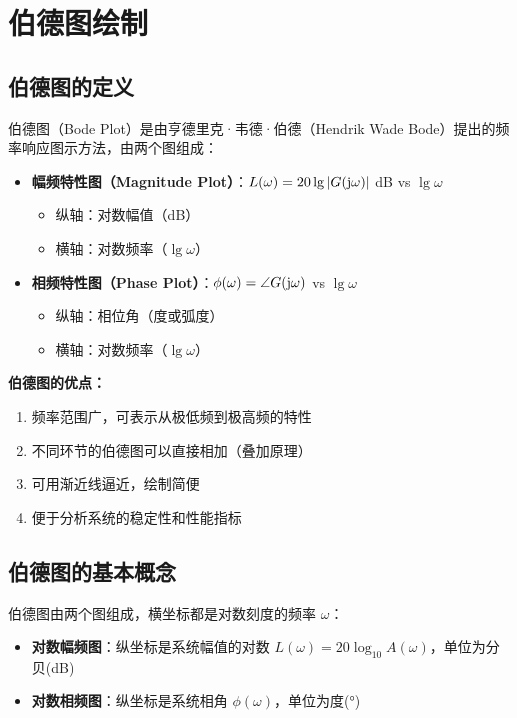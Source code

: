 \section{伯德图绘制}

\subsection{伯德图的定义}
伯德图（Bode Plot）是由亨德里克·韦德·伯德（Hendrik Wade Bode）提出的频率响应图示方法，由两个图组成：

\begin{itemize}
    \item \textbf{幅频特性图（Magnitude Plot）}：$L(\omega) = 20\lg|G(\mathrm{j}\omega)|$ dB vs $\lg\omega$
    \begin{itemize}
        \item 纵轴：对数幅值（dB）
        \item 横轴：对数频率（$\lg\omega$）
    \end{itemize}
    \item \textbf{相频特性图（Phase Plot）}：$\phi(\omega) = \angle G(\mathrm{j}\omega)$ vs $\lg\omega$
    \begin{itemize}
        \item 纵轴：相位角（度或弧度）
        \item 横轴：对数频率（$\lg\omega$）
    \end{itemize}
\end{itemize}

\textbf{伯德图的优点：}
\begin{enumerate}
    \item 频率范围广，可表示从极低频到极高频的特性
    \item 不同环节的伯德图可以直接相加（叠加原理）
    \item 可用渐近线逼近，绘制简便
    \item 便于分析系统的稳定性和性能指标
\end{enumerate}

\subsection{伯德图的基本概念}

伯德图由两个图组成，横坐标都是对数刻度的频率 $\omega$：
\begin{itemize}
    \item \textbf{对数幅频图}：纵坐标是系统幅值的对数 $L(\omega) = 20\log_{10}A(\omega)$，单位为分贝(dB)
    \item \textbf{对数相频图}：纵坐标是系统相角 $\phi(\omega)$，单位为度(°)
\end{itemize}

